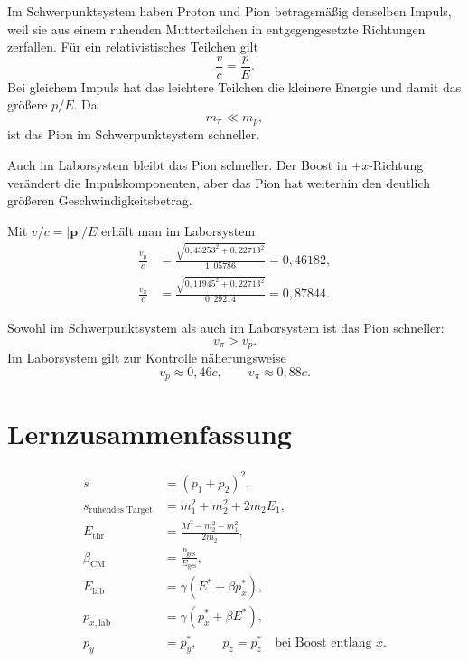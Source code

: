 \documentclass[11pt,a4paper]{scrartcl}
\newcommand{\abs}[1]{\left| #1 \right|}
\newcommand{\vect}[1]{\bm{#1}}
\theoremstyle{definition}
\theoremstyle{plain}
\theoremstyle{remark}
\begin{document}
\begin{calculationbox}[title=Qualitative Begr\"undung]
Im Schwerpunktsystem haben Proton und Pion betragsm\"a\ss ig denselben Impuls, weil sie aus einem ruhenden Mutterteilchen in entgegengesetzte Richtungen zerfallen. F\"ur ein relativistisches Teilchen gilt
\[
    \frac{v}{c}=\frac{p}{E}.
\]
Bei gleichem Impuls hat das leichtere Teilchen die kleinere Energie und damit das gr\"o\ss ere $p/E$. Da
\[
    m_\pi \ll m_p,
\]
ist das Pion im Schwerpunktsystem schneller.

Auch im Laborsystem bleibt das Pion schneller. Der Boost in $+x$-Richtung ver\"andert die Impulskomponenten, aber das Pion hat weiterhin den deutlich gr\"o\ss eren Geschwindigkeitsbetrag.
\end{calculationbox}

\begin{sidecalcbox}[title=Kontrolle durch direkte Rechnung]
Mit $v/c=\abs{\vect{p}}/E$ erh\"alt man im Laborsystem
\begin{align*}
    \frac{v_p}{c}
    &=\frac{\sqrt{0,43253^2+0,22713^2}}{1,05786}
    =0,46182,\\[0.5em]
    \frac{v_\pi}{c}
    &=\frac{\sqrt{0,11945^2+0,22713^2}}{0,29214}
    =0,87844.
\end{align*}
\end{sidecalcbox}

\begin{answerbox}
Sowohl im Schwerpunktsystem als auch im Laborsystem ist das Pion schneller:
\[
    \boxed{v_\pi>v_p}.
\]
Im Laborsystem gilt zur Kontrolle n\"aherungsweise
\[
    \boxed{v_p\approx 0,46c,\qquad v_\pi\approx 0,88c}.
\]
\end{answerbox}

\FloatBarrier
\newpage

\section*{Lernzusammenfassung}

\begin{summarybox}[title={Formeln, die man sicher beherrschen sollte}]
\begin{align*}
    s&=(p_1+p_2)^2,\\
    s_{\text{ruhendes Target}}&=m_1^2+m_2^2+2m_2E_1,\\
    E_{\mathrm{thr}}&=\frac{M^2-m_2^2-m_1^2}{2m_2},\\
    \beta_{\mathrm{CM}}&=\frac{p_{\mathrm{ges}}}{E_{\mathrm{ges}}},\\
    E_{\mathrm{lab}}&=\gamma(E^\ast+\beta p_x^\ast),\\
    p_{x,\mathrm{lab}}&=\gamma(p_x^\ast+\beta E^\ast),\\
    p_y&=p_y^\ast,\qquad p_z=p_z^\ast \quad \text{bei Boost entlang } x.
\end{align*}
\end{summarybox}
\end{document}
